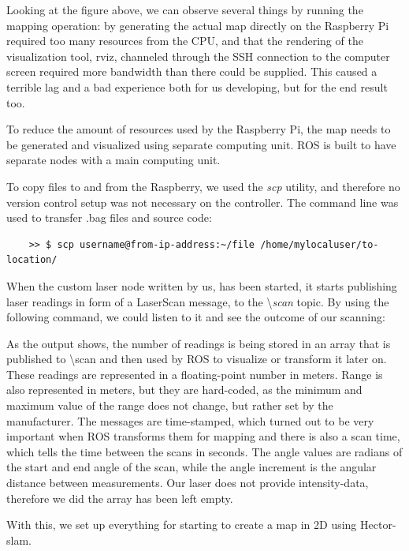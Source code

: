 Looking at the figure above, we can observe several things by running the mapping operation: by generating the actual map directly on the Raspberry Pi required too many resources from the CPU, and that the rendering of the visualization tool, rviz, channeled through the SSH connection to the computer screen required more bandwidth than there could be supplied. This caused a terrible lag and a bad experience both for us developing, but for the end result too.

To reduce the amount of resources used by the Raspberry Pi, the map needs to be generated and visualized using separate computing unit. ROS is built to have separate nodes with a main computing unit.

To copy files to and from the Raspberry, we used the \textit{scp} utility, and therefore no version control setup was not necessary on the controller. The command line was used to transfer .bag files and source code:
\begin{lstlisting}
	>> $ scp username@from-ip-address:~/file /home/mylocaluser/to-location/
\end{lstlisting}

When the custom laser node written by us, has been started, it starts publishing laser readings in form of a LaserScan message, to the \textbackslash\textit{scan} topic. By using the following command, we could listen to it and see the outcome of our scanning:



As the output shows, the number of readings is being stored in an array that is published to \textbackslash scan and then used by ROS to visualize or transform it later on. These readings are represented in a floating-point number in meters. Range is also represented in meters, but they are hard-coded, as the minimum and maximum value of the range does not change, but rather set by the manufacturer. The messages are time-stamped, which turned out to be very important when ROS transforms them for mapping and there is also a scan time, which tells the time between the scans in seconds. The angle values are radians of the start and end angle of the scan, while the angle increment is the angular distance between measurements. Our laser does not provide intensity-data, therefore we did the array has been left empty.

With this, we set up everything for starting to create a map in 2D using Hector-slam.

